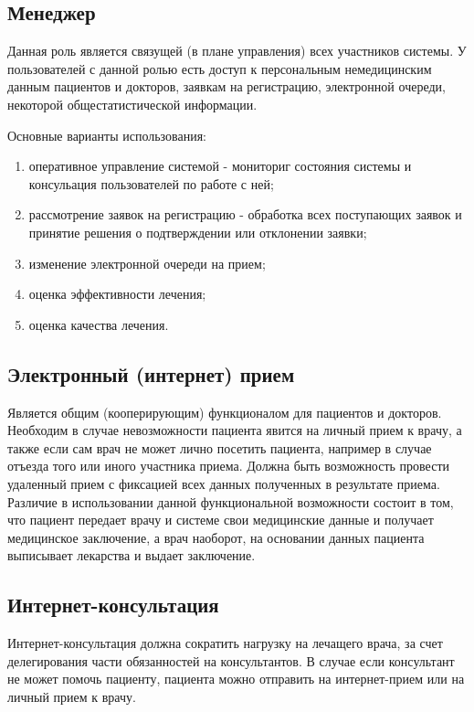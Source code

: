 \subsection{Менеджер}
Данная роль является связущей (в плане управления) всех участников системы. У
пользователей с данной ролью есть доступ к персональным немедицинским данным
пациентов и докторов, заявкам на регистрацию, электронной очереди, некоторой
общестатистической информации.

Основные варианты использования:

\begin{enumerate}
  \item оперативное управление системой - мониториг состояния системы и
  консульация пользователей по работе с ней;
  \item рассмотрение заявок на регистрацию - обработка всех поступающих заявок и
  принятие решения о подтверждении или отклонении заявки;
  \item изменение электронной очереди на прием;
  \item оценка эффективности лечения;
  \item оценка качества лечения.
\end{enumerate}

\subsection{Электронный (интернет) прием}
Является общим (кооперирующим) функционалом для пациентов и докторов. Необходим
в случае невозможности пациента явится на личный прием к врачу, а также если сам
врач не может лично посетить пациента, например в случае отъезда того или иного
участника приема. Должна быть возможность провести удаленный прием с фиксацией
всех данных полученных в результате приема. Различие в использовании данной
функциональной возможности состоит в том, что пациент передает врачу и системе
свои медицинские данные и получает медицинское заключение, а врач наоборот, на
основании данных пациента выписывает лекарства и выдает заключение.

\subsection{Интернет-консультация}
Интернет-консультация должна сократить нагрузку на лечащего врача, за счет
делегирования части обязанностей на консультантов. В случае если консультант не
может помочь пациенту, пациента можно отправить на интернет-прием или на личный
прием к врачу.
